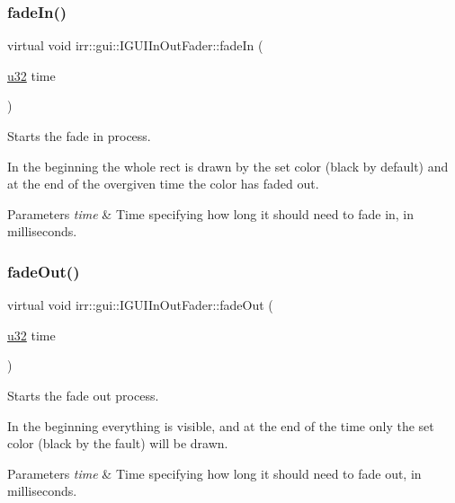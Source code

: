 \subsubsection{\texorpdfstring{fade\+In()}{fadeIn()}}
{\footnotesize\ttfamily virtual void irr\+::gui\+::\+I\+G\+U\+I\+In\+Out\+Fader\+::fade\+In (\begin{DoxyParamCaption}\item[{\hyperlink{namespaceirr_a0416a53257075833e7002efd0a18e804}{u32}}]{time }\end{DoxyParamCaption})\hspace{0.3cm}{\ttfamily [pure virtual]}}



Starts the fade in process. 

In the beginning the whole rect is drawn by the set color (black by default) and at the end of the overgiven time the color has faded out. 
\begin{DoxyParams}{Parameters}
{\em time} & Time specifying how long it should need to fade in, in milliseconds. \\
\hline
\end{DoxyParams}
\mbox{\label{classirr_1_1gui_1_1IGUIInOutFader_a5006c28699050d73be11b15ffc7ba993}} 
\subsubsection{\texorpdfstring{fade\+Out()}{fadeOut()}}
{\footnotesize\ttfamily virtual void irr\+::gui\+::\+I\+G\+U\+I\+In\+Out\+Fader\+::fade\+Out (\begin{DoxyParamCaption}\item[{\hyperlink{namespaceirr_a0416a53257075833e7002efd0a18e804}{u32}}]{time }\end{DoxyParamCaption})\hspace{0.3cm}{\ttfamily [pure virtual]}}



Starts the fade out process. 

In the beginning everything is visible, and at the end of the time only the set color (black by the fault) will be drawn. 
\begin{DoxyParams}{Parameters}
{\em time} & Time specifying how long it should need to fade out, in milliseconds. \\
\hline
\end{DoxyParams}
\mbox{\label{classirr_1_1gui_1_1IGUIInOutFader_aba1cdb4928662a2340aa6600850e03d1}} 

